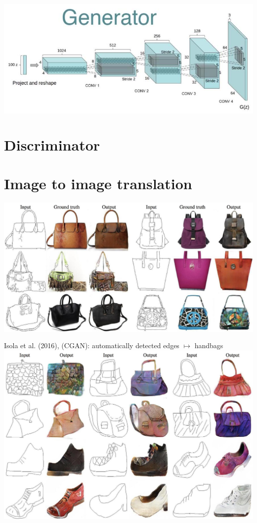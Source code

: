 \documentclass[10pt]{article}
\begin{document}
\begin{center}
\includegraphics[max width=\textwidth]{2024_01_08_a381fc3992661ee7020eg-09}
\end{center}

\section*{Discriminator}
\section*{Image to image translation}
\begin{center}
\includegraphics[max width=\textwidth]{2024_01_08_a381fc3992661ee7020eg-10}
\end{center}

Isola et al. (2016), (CGAN): automatically detected edges $\mapsto$ handbags
\includegraphics[max width=\textwidth, center]{2024_01_08_a381fc3992661ee7020eg-10(1)}
\end{document}
